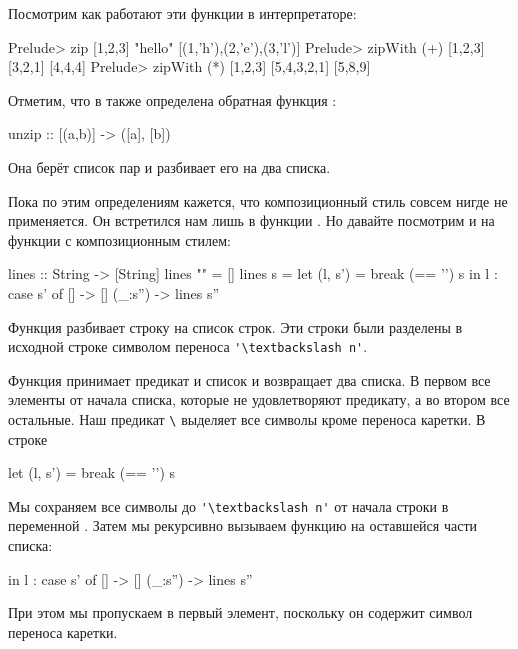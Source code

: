 Посмотрим как работают эти функции в интерпретаторе:

\begin{code}
Prelude> zip [1,2,3] "hello"
[(1,'h'),(2,'e'),(3,'l')]
Prelude> zipWith (+) [1,2,3] [3,2,1]
[4,4,4]
Prelude> zipWith (*) [1,2,3] [5,4,3,2,1]
[5,8,9]
\end{code}

Отметим, что в  также определена обратная функция :

\begin{code}
unzip   :: [(a,b)] -> ([a], [b]) 
\end{code}

Она берёт список пар и разбивает его на два списка.

Пока по этим определениям кажется, что композиционный стиль 
совсем нигде не применяется. Он встретился нам лишь в функции
. Но давайте посмотрим и на функции
с композиционным стилем:

\begin{code}
lines            :: String -> [String]
lines ""         =  []
lines s          =  let (l, s') = break (== '\n') s
                    in  l : case s' of
                              []      -> []
                              (_:s'') -> lines s''
\end{code}

Функция  разбивает строку на список строк. 
Эти строки были разделены в исходной строке 
символом переноса \verb!'\textbackslash n'!. 

Функция  принимает предикат и список 
и возвращает два списка. В первом все элементы от начала
списка, которые не удовлетворяют предикату, а во втором все остальные.
Наш предикат \verb!\! выделяет все символы 
кроме переноса каретки. В строке 

\begin{code}
let (l, s') = break (== '\n') s
\end{code}

Мы сохраняем все символы до \verb!'\textbackslash n'! от начала
строки в переменной . Затем мы рекурсивно вызываем
функцию  на оставшейся части списка:

\begin{code}
                    in  l : case s' of
                              []      -> []
                              (_:s'') -> lines s''
\end{code}

При этом мы пропускаем в  первый элемент, поскольку
он содержит символ переноса каретки. 

